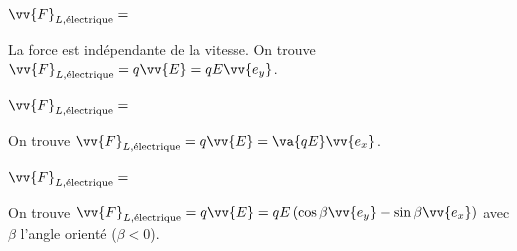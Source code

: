 \minusBigskip

\debutEntrainement


\begin{enonce}
$\vv{F}_{L,\text{électrique}}=$
\end{enonce}


\begin{corrige}
La force est indépendante de la vitesse. On trouve
$\vv{F}_{L,\text{électrique}}=q\vv{E}=qE\vv{e_{y}}$.
\end{corrige}



\begin{enonce}
$\vv{F}_{L,\text{électrique}}=$
\end{enonce}


\begin{corrige}
On trouve $\vv{F}_{L,\text{électrique}}=q\vv{E}=\va{qE}\vv{e_{x}}$.
\end{corrige}



\begin{enonce}
$\vv{F}_{L,\text{électrique}}=$
\end{enonce}


\begin{corrige}
On trouve $\vv{F}_{L,\text{électrique}}=q\vv{E}=qE\left(\cos\beta\vv{e_{y}}-\sin\beta\vv{e_{x}}\right)$
avec $\beta$ l'angle orienté ($\beta<0$). 
\end{corrige}

